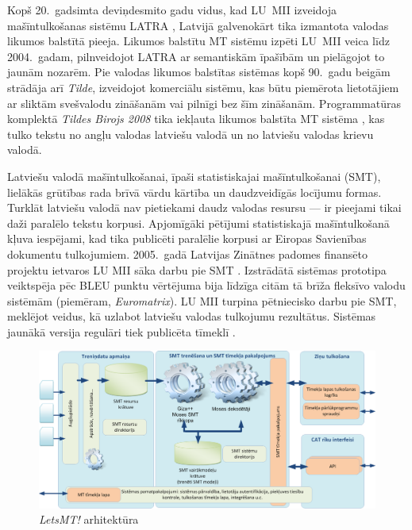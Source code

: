 \begin{multicols}{2}
Kopš 20.~gadsimta deviņdesmito gadu vidus, kad LU~MII izveidoja mašīntulkošanas sistēmu LATRA \cite{Meta23}, Latvijā galvenokārt tika izmantota valodas likumos balstītā pieeja.
Likumos balstītu MT sistēmu izpēti LU~MII veica līdz 2004.~gadam, pilnveidojot LATRA ar semantiskām īpašībām un pielāgojot to jaunām nozarēm.
Pie valodas likumos balstītas sistēmas kopš \mbox{90.~gadu} beigām strādāja arī \textit{Tilde}, izveidojot komerciālu sistēmu, kas būtu piemērota lietotājiem ar sliktām svešvalodu zināšanām vai pilnīgi bez šīm zināšanām.
Programmatūras komplektā \textit{Tildes Birojs 2008} tika iekļauta likumos balstīta MT sistēma \cite{Meta24}, kas tulko tekstu no angļu valodas latviešu valodā un no latviešu valodas krievu valodā. 

Latviešu valodā mašīntulkošanai, īpaši statistiskajai mašīntulkošanai (SMT), lielākās grūtības rada brīvā vārdu kārtība un daudzveidīgās locījumu formas.  Turklāt latviešu valodā nav pietiekami daudz valodas resursu --- ir pieejami tikai daži paralēlo tekstu korpusi.  Apjomīgāki pētījumi statistiskajā mašīntulkošanā kļuva iespējami, kad tika publicēti paralēlie korpusi ar Eiropas Savienības dokumentu tulkojumiem.  2005.~gadā Latvijas Zinātnes padomes finansēto projektu ietvaros LU MII sāka darbu pie SMT \cite{Meta25, Meta26}.  Izstrādātā sistēmas prototipa veiktspēja pēc BLEU punktu vērtējuma bija līdzīga citām tā brīža fleksīvo valodu sistēmām (piemēram, \textit{Euromatrix}).  LU MII turpina pētniecisko darbu pie SMT, meklējot veidus, kā uzlabot latviešu valodas tulkojumu rezultātus.  Sistēmas jaunākā versija regulāri tiek publicēta tīmeklī \cite{Meta27}.

\begin{figure}[htb]
  \center
  \includegraphics[width=\textwidth]{../_media/latvian/LetsMT_architecture_LV}
  \caption{\textit{LetsMT!} arhitektūra}
  \label{fig:LetsMT_architecture_LV}
\end{figure}


\end{multicols}
